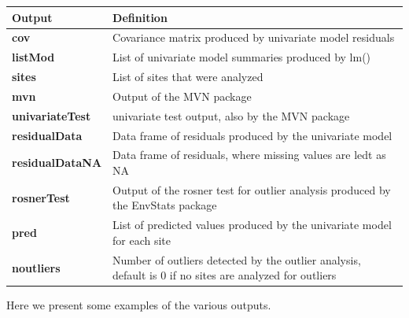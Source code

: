 \documentclass[11pt]{article}\usepackage[]{graphicx}\usepackage[]{color}
\newenvironment{knitrout}{}{} %
\begin{document}
\begin{knitrout}
\color{fgcolor}\begin{table}[H]
\centering\begin{table}[H]
\centering
\begin{tabular}{>{\bfseries\leavevmode\color{black}}l>{\raggedright\arraybackslash}p{30em}}
\toprule
Output & Definition\\
\midrule
\rowcolor{gray!6}  cov & Covariance matrix produced by univariate model residuals\\
listMod & List of univariate model summaries produced by lm()\\
\rowcolor{gray!6}  sites & List of sites that were analyzed\\
mvn & Output of the MVN package\\
\rowcolor{gray!6}  univariateTest & univariate test output, also by the MVN package\\
\addlinespace
residualData & Data frame of residuals produced by the univariate model\\
\rowcolor{gray!6}  residualDataNA & Data frame of residuals, where missing values are ledt as NA\\
rosnerTest & Output of the rosner test for outlier analysis produced by the EnvStats package\\
\rowcolor{gray!6}  pred & List of predicted values produced by the univariate model for each site\\
noutliers & Number of outliers detected by the outlier analysis, default is 0 if no sites are analyzed for outliers\\
\bottomrule
\end{tabular}
\end{table}
\end{table}


\end{knitrout}

Here we present some examples of the various outputs.
\end{document}
